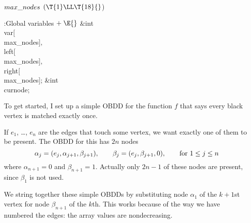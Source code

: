 \Y\B\4\D$\\{max\_nodes}$ \5
$(\T{1}\LL\T{18}{}$)\par
\Y\B\4:Global variables\X${}\mathrel+\E{}$\6
\&{int} \\{var}[\\{max\_nodes}]${},{}$ \\{left}[\\{max\_nodes}]${},{}$ %
\\{right}[\\{max\_nodes}];\6
\&{int} \\{curnode};\par
\fi

To get started, I set up a simple OBDD for the function $f$ that says
every black vertex is matched exactly once.

If $e_1$, \dots, $e_n$ are the edges that touch some vertex, we want exactly
one of them to be present. The OBDD for this has $2n$ nodes
$$\alpha_j=(e_j,\alpha_{j+1},\beta_{j+1}),\qquad
\beta_j =(e_j,\beta_{j+1},0),\qquad\hbox{for $1\le j\le n$}$$
where $\alpha_{n+1}=0$ and $\beta_{n+1}=1$. Actually only $2n-1$ of these
nodes are present, since $\beta_1$ is not used.

We string together these simple OBDDs by substituting node $\alpha_1$ of the
$k+1$st vertex for node $\beta_{n+1}$ of the $k$th. This works because of the
way we have numbered the edges: the  array values are
nondecreasing.

